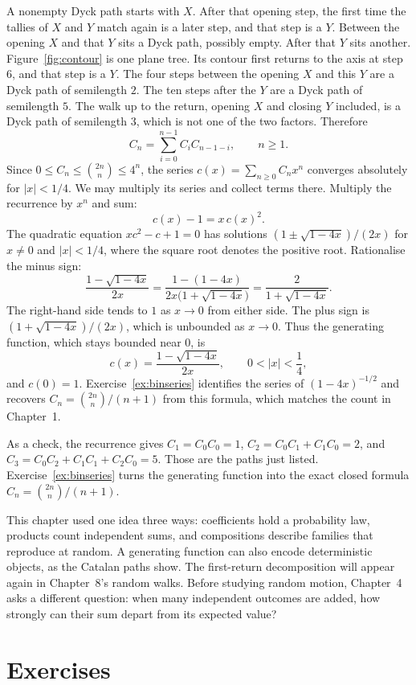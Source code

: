 A nonempty Dyck path starts with $X$. After that opening step, the first time the tallies of $X$ and $Y$ match again is a later step, and that step is a $Y$. Between the opening $X$ and that $Y$ sits a Dyck path, possibly empty. After that $Y$ sits another. Figure~\ref{fig:contour} is one plane tree. Its contour first returns to the axis at step $6$, and that step is a $Y$. The four steps between the opening $X$ and this $Y$ are a Dyck path of semilength $2$. The ten steps after the $Y$ are a Dyck path of semilength $5$. The walk up to the return, opening $X$ and closing $Y$ included, is a Dyck path of semilength $3$, which is not one of the two factors. Therefore
\[
 C_n=\sum_{i=0}^{n-1}C_i C_{n-1-i},\qquad n\ge1.
\]
Since $0\le C_n\le\binom{2n}{n}\le4^n$, the series $c(x)=\sum_{n\ge0}C_nx^n$ converges absolutely for $|x|<1/4$. We may multiply its series and collect terms there. Multiply the recurrence by $x^n$ and sum:
\[
 c(x)-1=x\,c(x)^2.
\]
The quadratic equation $x c^2-c+1=0$ has solutions $(1\pm\sqrt{1-4x})/(2x)$ for $x\ne0$ and $|x|<1/4$, where the square root denotes the positive root. Rationalise the minus sign:
\[
 \frac{1-\sqrt{1-4x}}{2x}=\frac{1-(1-4x)}{2x\bigl(1+\sqrt{1-4x}\bigr)}=\frac{2}{1+\sqrt{1-4x}}.
\]
The right-hand side tends to $1$ as $x\to0$ from either side. The plus sign is $(1+\sqrt{1-4x})/(2x)$, which is unbounded as $x\to0$. Thus the generating function, which stays bounded near $0$, is
\[
 c(x)=\frac{1-\sqrt{1-4x}}{2x},\qquad 0<|x|<\frac14,
\]
and $c(0)=1$. Exercise~\ref{ex:binseries} identifies the series of $(1-4x)^{-1/2}$ and recovers $C_n=\binom{2n}{n}/(n+1)$ from this formula, which matches the count in Chapter~1.

As a check, the recurrence gives $C_1=C_0C_0=1$, $C_2=C_0C_1+C_1C_0=2$, and $C_3=C_0C_2+C_1C_1+C_2C_0=5$. Those are the paths just listed. Exercise~\ref{ex:binseries} turns the generating function into the exact closed formula $C_n=\binom{2n}{n}/(n+1)$.

This chapter used one idea three ways: coefficients hold a probability law, products count independent sums, and compositions describe families that reproduce at random. A generating function can also encode deterministic objects, as the Catalan paths show. The first-return decomposition will appear again in Chapter~8's random walks. Before studying random motion, Chapter~4 asks a different question: when many independent outcomes are added, how strongly can their sum depart from its expected value?

\section{Exercises}

